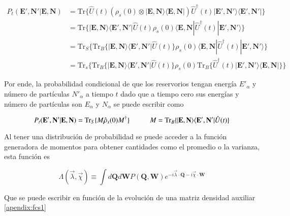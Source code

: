 \begin{align*} 
    P_{t}(\textbf{E}',\textbf{N}'|\textbf{E},\textbf{N}) & =  \text{Tr}\{\hat{U}(t)(\rho_{s}(0)\otimes |\textbf{E}, \textbf{N}\rangle  \langle \textbf{E}, \textbf{N}| ) \hat{U}^{\dagger}(t)  |\textbf{E}', \textbf{N}'\rangle  \langle \textbf{E}', \textbf{N}'| \} \\
        & =  \text{Tr}\{|\textbf{E},\textbf{N} \rangle \langle \textbf{E}', \textbf{N}'| \hat{U}(t)\rho_{s}(0) \langle \textbf{E}, \textbf{N}|\hat{U}^{\dagger}(t)|\textbf{E}', \textbf{N}'\rangle \}      \\ 
        & = \text{Tr}_{S}\{ \text{Tr}_{B}\{|\textbf{E},\textbf{N} \rangle \langle \textbf{E}', \textbf{N}'|\hat{U}(t) \}\rho_{s}(0)\langle \textbf{E}, \textbf{N}|\hat{U}^{\dagger}(t)|\textbf{E}', \textbf{N}'\rangle      \} \\
        & = \text{Tr}_{s}\{ \text{Tr}_{B}\{|\textbf{E},\textbf{N}\rangle \langle \textbf{E}',\textbf{N}'|\hat{U}(t)  \} \rho_{s}(0) \text{Tr}_{B}\{\hat{U}^{\dagger}(t) |\textbf{E}',\textbf{N}' \rangle \langle \textbf{E},\textbf{N}| \}     \}
    \end{align*}    

Por ende, la probabilidad condicional de que los reservorios tengan energía $E'_{\alpha}$ y número de partículas $N'_{\alpha}$ a tiempo $t$ dado que a tiempo cero sus energías y número de partículas son $E_{\alpha}$ y $N_{\alpha}$ se puede escribir como

\begin{equation*}
    P_{t}(\textbf{E}',\textbf{N}'|\textbf{E},\textbf{N}) = \text{Tr}_{S}\{M \hat{\rho}_{s}(0)M^{\dagger} \}  \hspace{10mm} M = \text{Tr}_{B}\{|\textbf{E},\textbf{N} \rangle \langle \textbf{E}',\textbf{N}' | \hat{U}(t)\}
\end{equation*}

Al tener una distribución de probabilidad se puede acceder a la función generadora de momentos para obtener cantidades como el promedio o la varianza, esta función es

\begin{equation}
    \Lambda(\vec{\lambda},\vec{\chi}) \equiv \int d\textbf{Q} d\textbf{W}P(\textbf{Q},\textbf{W}) e^{-i\vec{\lambda}\cdot \textbf{Q} -i\vec{\chi}\cdot \textbf{W} }
\label{sec2funciongeneradora}
\end{equation}

Que se puede escribir en función de la evolución de una matriz densidad auxiliar \ref{apendix:fcs1}

